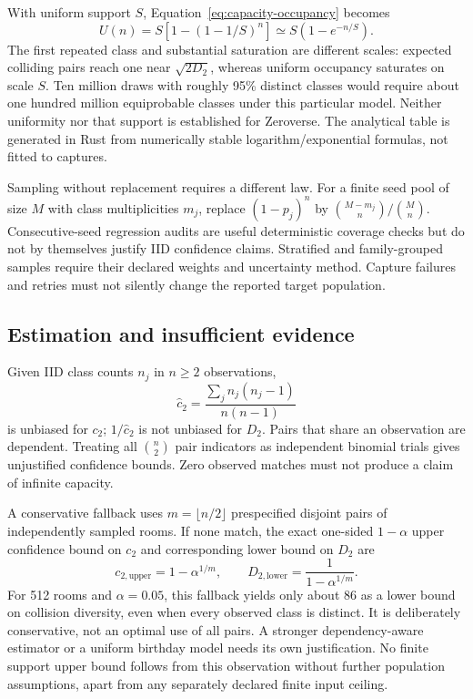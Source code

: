 \documentclass{article}
\begin{document}
With uniform support $S$, Equation~\ref{eq:capacity-occupancy} becomes
\begin{equation}
 U(n)=S\left[1-(1-1/S)^n\right]\simeq S\left(1-e^{-n/S}\right).
 \label{eq:capacity-uniform}
\end{equation}
The first repeated class and substantial saturation are different scales:
expected colliding pairs reach one near $\sqrt{2D_2}$, whereas uniform occupancy
saturates on scale $S$. Ten million draws with roughly 95\% distinct classes
would require about one hundred million equiprobable classes under this
particular model. Neither uniformity nor that support is established for
Zeroverse. The analytical table is generated in Rust from numerically stable
logarithm/exponential formulas, not fitted to captures.



Sampling without replacement requires a different law. For a finite seed pool
of size $M$ with class multiplicities $m_j$, replace $(1-p_j)^n$ by
$\binom{M-m_j}{n}/\binom{M}{n}$. Consecutive-seed regression audits are useful
deterministic coverage checks but do not by themselves justify IID confidence
claims. Stratified and family-grouped samples require their declared weights
and uncertainty method. Capture failures and retries must not silently change
the reported target population.

\subsection{Estimation and insufficient evidence}
Given IID class counts $n_j$ in $n\geq2$ observations,
\begin{equation}
 \widehat c_2=\frac{\sum_jn_j(n_j-1)}{n(n-1)}
 \label{eq:capacity-estimator}
\end{equation}
is unbiased for $c_2$; $1/\widehat c_2$ is not unbiased for $D_2$.
Pairs that share an observation are dependent. Treating all $\binom n2$ pair
indicators as independent binomial trials gives unjustified confidence bounds.
Zero observed matches must not produce a claim of infinite capacity.

A conservative fallback uses $m=\lfloor n/2\rfloor$ prespecified disjoint pairs
of independently sampled rooms. If none match, the exact one-sided
$1-\alpha$ upper confidence bound on $c_2$ and corresponding lower bound on $D_2$ are
\begin{equation}
 c_{2,\mathrm{upper}}=1-\alpha^{1/m},\qquad
 D_{2,\mathrm{lower}}=\frac{1}{1-\alpha^{1/m}}.
 \label{eq:capacity-zero}
\end{equation}
For 512 rooms and $\alpha=0.05$, this fallback yields only about 86 as a lower
bound on collision diversity, even when every observed class is distinct.
It is deliberately conservative, not an optimal use of all pairs. A stronger
dependency-aware estimator or a uniform birthday model needs its own justification.
No finite support upper bound follows from this observation without further
population assumptions, apart from any separately declared finite input ceiling.
\end{document}

